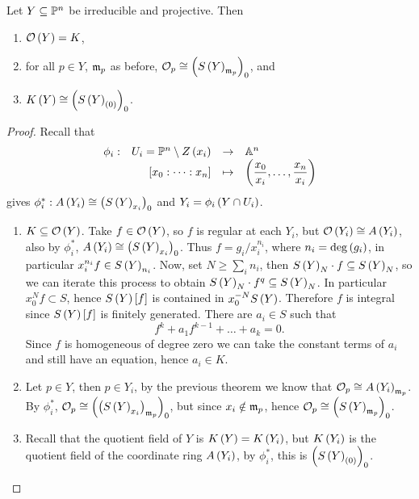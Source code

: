 \begin{theorem}
Let $ Y \subseteq \P^n $ be irreducible and projective. Then
\begin{enumerate}
\item $ \OO\rb{Y} = K $,
\item for all $ p \in Y $, $ \mm_p $ as before, $ \OO_p \cong \rb{S\rb{Y}_{\mm_p}}_0 $, and
\item $ K\rb{Y} \cong \rb{S\rb{Y}_{\rb{0}}}_0 $.
\end{enumerate}
\end{theorem}

\begin{proof}
Recall that
$$ \function[\phi_i]{U_i = \P^n \setminus Z\rb{x_i}}{\A^n}{\sb{x_0 : \dots : x_n}}{\rb{\dfrac{x_0}{x_i}, \dots, \dfrac{x_n}{x_i}}} $$
gives $ \phi_i^* : A\rb{Y_i} \cong \rb{S\rb{Y}_{x_i}}_0 $ and $ Y_i = \phi_i\rb{Y \cap U_i} $.
\begin{enumerate}
\item $ K \subseteq \OO\rb{Y} $. Take $ f \in \OO\rb{Y} $, so $ f $ is regular at each $ Y_i $, but $ \OO\rb{Y_i} \cong A\rb{Y_i} $, also by $ \phi_i^* $, $ A\rb{Y_i} \cong \rb{S\rb{Y}_{x_i}}_0 $. Thus $ f = g_i / x_i^{n_i} $, where $ n_i = \deg\rb{g_i} $, in particular $ x_i^{n_i}f \in S\rb{Y}_{n_i} $. Now, set $ N \ge \sum_i n_i $, then $ S\rb{Y}_N \cdot f \subseteq S\rb{Y}_N $, so we can iterate this process to obtain $ S\rb{Y}_N \cdot f^q \subseteq S\rb{Y}_N $. In particular $ x_0^Nf \subset S $, hence $ S\rb{Y}\sb{f} $ is contained in $ x_0^{-N}S\rb{Y} $. Therefore $ f $ is integral since $ S\rb{Y}\sb{f} $ is finitely generated. There are $ a_i \in S $ such that
$$ f^k + a_1f^{k - 1} + \dots + a_k = 0. $$
Since $ f $ is homogeneous of degree zero we can take the constant terms of $ a_i $ and still have an equation, hence $ a_i \in K $.
\item Let $ p \in Y $, then $ p \in Y_i $, by the previous theorem we know that $ \OO_p \cong A\rb{Y_i}_{\mm_p} $. By $ \phi_i^* $, $ \OO_p \cong \rb{\rb{S\rb{Y}_{x_i}}_{\mm_p}}_0 $, but since $ x_i \notin \mm_p $, hence $ \OO_p \cong \rb{S\rb{Y}_{\mm_p}}_0 $.
\item Recall that the quotient field of $ Y $ is $ K\rb{Y} = K\rb{Y_i} $, but $ K\rb{Y_i} $ is the quotient field of the coordinate ring $ A\rb{Y_i} $, by $ \phi_i^* $, this is $ \rb{S\rb{Y}_{\rb{0}}}_0 $.
\end{enumerate}
\end{proof}


